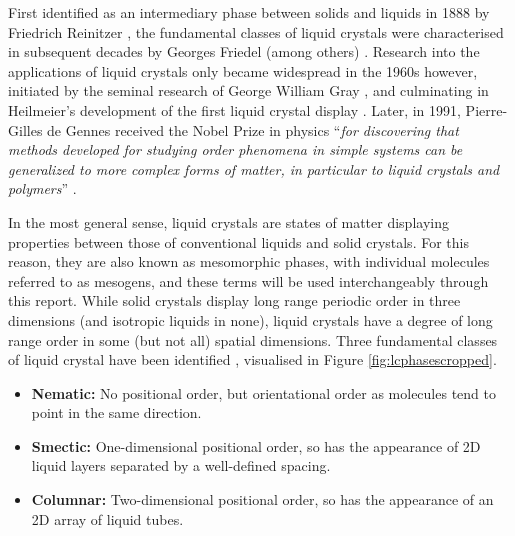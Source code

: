 \documentclass[11pt, a4paper]{article} %
\begin{document}
First identified as an intermediary phase between solids and liquids in 1888 by Friedrich Reinitzer \cite{Reinitzer1888}, the fundamental classes of liquid crystals were characterised in subsequent decades by Georges Friedel (among others) \cite{Friedel1922}. Research into the applications of liquid crystals only became widespread in the 1960s however, initiated by the seminal research of George William Gray \cite{Gray1962}, and culminating in Heilmeier's development of the first liquid crystal display \cite{Heilmeier1969, Heilmeier1968}. Later, in 1991, Pierre-Gilles de Gennes  received the Nobel Prize in physics ``\textit{for discovering that methods developed for studying order phenomena in simple systems can be generalized to more complex forms of matter, in particular to liquid crystals and polymers}'' \cite{DeGennes1992}.

In the most general sense, liquid crystals are states of matter displaying properties between those of conventional liquids and solid crystals. For this reason, they are also known as mesomorphic phases, with individual molecules referred to as mesogens, and these terms will be used interchangeably through this report. While solid crystals display long range periodic order in three dimensions (and isotropic liquids in none), liquid crystals have a degree of long range order in some (but not all) spatial dimensions. Three fundamental classes of liquid crystal have been identified \cite{DeGennes1993}, visualised in Figure \ref{fig:lcphasescropped}.

\begin{itemize}
	\item \textbf{Nematic:} No positional order, but orientational order as molecules tend to point in the same direction.
	\item \textbf{Smectic:} One-dimensional positional order, so has the appearance of 2D liquid layers separated by a well-defined spacing.
	\item \textbf{Columnar:} Two-dimensional positional order, so has the appearance of an 2D array of liquid tubes.
\end{itemize}

\end{document}
